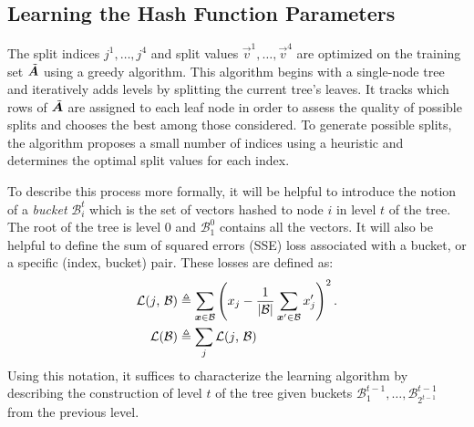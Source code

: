 
\subsection{Learning the Hash Function Parameters}

The split indices ${j^1,\ldots,j^4}$ and split values $\vec{v}^1,\ldots,\vec{v}^4$ are optimized on the training set $\tilde{\bm{A}}$ using a greedy algorithm. This algorithm begins with a single-node tree and iteratively adds levels by splitting the current tree's leaves. It tracks which rows of $\tilde{\bm{A}}$ are assigned to each leaf node in order to assess the quality of possible splits and chooses the best among those considered. To generate possible splits, the algorithm proposes a small number of indices using a heuristic and determines the optimal split values for each index.%

To describe this process more formally, it will be helpful to introduce the notion of a \textit{bucket} $\mathcal{B}^t_i$ which is the set of vectors hashed to node $i$ in level $t$ of the tree. The root of the tree is level 0 and $\mathcal{B}^0_1$ contains all the vectors. It will also be helpful to define the sum of squared errors (SSE) loss associated with a bucket, or a specific (index, bucket) pair. These losses are defined as:
\begin{align}
    \mathcal{L}(j \text{, } \mathcal{B}) &\triangleq \sum_{\bm{x} \in \mathcal{B}} \left( x_j - \frac{1}{|\mathcal{B}|}\sum_{\bm{x}^\prime \in \mathcal{B}} x^\prime_j \right)^2.  \\
    \mathcal{L}(\mathcal{B}) &\triangleq \sum_j \mathcal{L}(j \text{, } \mathcal{B})
\end{align}
Using this notation, it suffices to characterize the learning algorithm by describing the construction of level $t$ of the tree given buckets $\mathcal{B}^{t-1}_1,\ldots,\mathcal{B}^{t-1}_{2^{t-1}}$ from the previous level.

